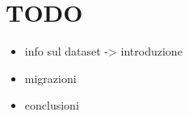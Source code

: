 \chapter{TODO}
\begin{itemize}
	\item info sul dataset -> introduzione
	\item migrazioni
	\item conclusioni
\end{itemize}